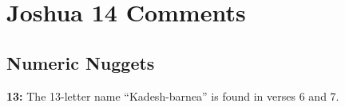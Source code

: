 \section{Joshua 14 Comments}

\subsection{Numeric Nuggets}
\textbf{13: } The 13-letter name ``Kadesh-barnea'' is found in verses 6 and 7.
